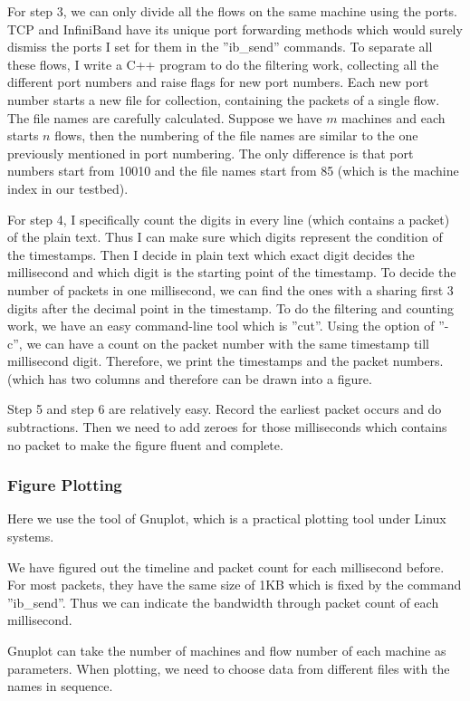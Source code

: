 \documentclass[12pt,a4paper]{article}
\begin{document}
For step 3, we can only divide all the flows on the same machine using the ports.
TCP and InfiniBand have its unique port forwarding methods which would surely dismiss the ports I set for them in the ''ib\_send'' commands.
To separate all these flows, I write a C++ program to do the filtering work, collecting all the different port numbers and raise flags for new port numbers.
Each new port number starts a new file for collection, containing the packets of a single flow.
The file names are carefully calculated.
Suppose we have $m$ machines and each starts $n$ flows, then the numbering of the file names are similar to the one previously mentioned in port numbering.
The only difference is that port numbers start from 10010 and the file names start from 85 (which is the machine index in our testbed).

For step 4, I specifically count the digits in every line (which contains a packet) of the plain text. Thus I can make sure which digits represent the condition
of the timestamps. 
Then I decide in plain text which exact digit decides the millisecond and which digit is the starting point of the timestamp.
To decide the number of packets in one millisecond, we can find the ones with a sharing first 3 digits after the decimal point in the timestamp.
To do the filtering and counting work, we have an easy command-line tool which is ''cut''.
Using the option of ''-c'', we can have a count on the packet number with the same timestamp till millisecond digit.
Therefore, we print the timestamps and the packet numbers. (which has two columns and therefore can be drawn into a figure.

Step 5 and step 6 are relatively easy. 
Record the earliest packet occurs and do subtractions.
Then we need to add zeroes for those milliseconds which contains no packet to make the figure fluent and complete.

\subsubsection{Figure Plotting}

Here we use the tool of Gnuplot, which is a practical plotting tool under Linux systems.

We have figured out the timeline and packet count for each millisecond before.
For most packets, they have the same size of 1KB which is fixed by the command ''ib\_send''.
Thus we can indicate the bandwidth through packet count of each millisecond.

Gnuplot can take the number of machines and flow number of each machine as parameters.
When plotting, we need to choose data from different files with the names in sequence.
\end{document}
